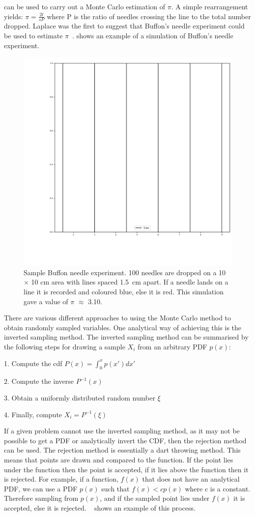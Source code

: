  can be used to carry out a Monte Carlo estimation of $\pi$. A simple rearrangement yields: $\pi = \tfrac{2l}{sP}$ where P is the ratio of needles crossing the line to the total number dropped. Laplace was the first to suggest that Buffon's needle experiment could be used to estimate $\pi$~\cite{beckmann2015history}. 
 shows an example of a simulation of Buffon's needle experiment.

\begin{figure}[!htb]
\centering
\includegraphics[width=.5\textwidth]{buffon.pdf}
\caption{Sample Buffon needle experiment. 100 needles are dropped on a 10 $\times$ 10 cm area with lines spaced 1.5~cm apart. If a needle lands on a line it is recorded and coloured blue, else it is red. This simulation gave a value of $\pi$ $\approx$ 3.10.}
\label{fig:buffon-needle}
\end{figure}

There are various different approaches to using the Monte Carlo method to obtain randomly sampled variables.
One analytical way of achieving this is the inverted sampling method.
The inverted sampling method can be summarised by the following steps for drawing a sample $X_i$ from an arbitrary PDF $p(x)$:

\medskip

1. Compute the \gls*{cdf} $P(x)=\int^{x}_{0}p(x')dx'$

2. Compute the inverse $P^{-1}(x)$

3. Obtain a uniformly distributed random number $\xi$

4. Finally, compute $X_i = P^{-1}(\xi)$

\medskip

If a given problem cannot use the inverted sampling method, as it may not be possible to get a PDF or analytically invert the CDF, then the rejection method can be used.
The rejection method is essentially a dart throwing method.
This means that points are drawn and compared to the function.
If the point lies under the function then the point is accepted, if it lies above the function then it is rejected.
For example, if a function, $f(x)$ that does not have an analytical PDF, we can use a PDF $p(x)$ such that $f(x) < cp(x)$ where c is a constant.
Therefore sampling from $p(x)$, and if the sampled point lies under $f(x)$ it is accepted, else it is rejected.
~ shows an example of this process.


